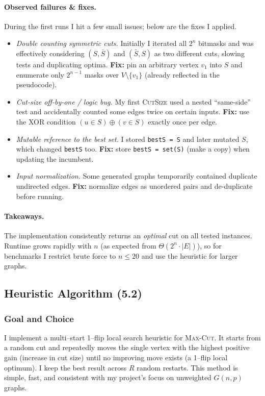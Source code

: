 \documentclass[12pt]{article}
\begin{document}
\paragraph{Observed failures \& fixes.}
During the first runs I hit a few small issues; below are the fixes I applied.
\begin{itemize}
  \item \textit{Double counting symmetric cuts.}  
  Initially I iterated all $2^n$ bitmasks and was effectively
  considering $(S,\bar S)$ and $(\bar S,S)$ as two different cuts, slowing tests and
  duplicating optima. \textbf{Fix:} pin an arbitrary vertex $v_1$ into $S$ and enumerate
  only $2^{n-1}$ masks over $V\setminus\{v_1\}$ (already reflected in the pseudocode).
  \item \textit{Cut-size off-by-one / logic bug.}  
  My first \textsc{CutSize} used a nested ``same-side'' test and
  accidentally counted some edges twice on certain inputs.  
  \textbf{Fix:} use the XOR condition
  $(u\in S)\oplus(v\in S)$ exactly once per edge.
  \item \textit{Mutable reference to the best set.}  
  I stored \verb|bestS = S| and later mutated $S$,
  which changed \verb|bestS| too.  
  \textbf{Fix:} store \verb|bestS = set(S)| (make a copy) when updating the incumbent.
  \item \textit{Input normalization.}  
  Some generated graphs temporarily contained duplicate undirected edges.
  \textbf{Fix:} normalize edges as unordered pairs and de-duplicate before running.
\end{itemize}

\paragraph{Takeaways.}
The implementation consistently returns an \emph{optimal} cut on all tested instances.
Runtime grows rapidly with $n$ (as expected from $\Theta(2^{n}\!\cdot\!|E|)$),
so for benchmarks I restrict brute force to $n\le 20$ and use the heuristic
for larger graphs.
\subsection{Heuristic Algorithm (5.2)}
\label{sec:heuristic-impl}

\subsubsection*{Goal and Choice}
I implement a multi–start 1–flip local search heuristic for \textsc{Max-Cut}. It starts from a random cut and repeatedly moves the single vertex with the highest positive gain (increase in cut size) until no improving move exists (a 1–flip local optimum). I keep the best result across $R$ random restarts. This method is simple, fast, and consistent with my project’s focus on unweighted $G(n,p)$ graphs.
\end{document}
